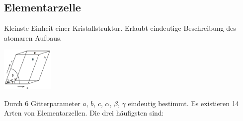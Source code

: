 \subsection{Elementarzelle}
Kleinste Einheit einer Kristallstruktur. Erlaubt eindeutige Beschreibung des atomaren Aufbaus. 

\begin{multicols}{2}
    \includegraphics[width=2.5cm]{images/1_Elementarzelle.png}
    
\columnbreak

    Durch 6 Gitterparameter $a$, $b$, $c$, $\alpha$, $\beta$, $\gamma$ eindeutig bestimmt. Es existieren 14 Arten von Elementarzellen. Die drei häufigsten sind: \\
\end{multicols}


